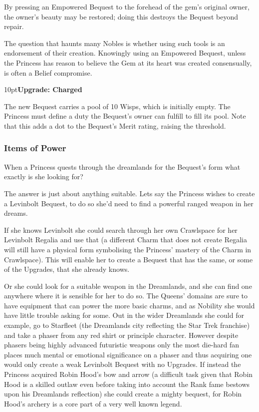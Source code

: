 By pressing an Empowered Bequest to the forehead of the gem's original owner, the owner's beauty may be restored; doing this destroys the Bequest beyond repair.

The question that haunts many Nobles is whether using such tools is an endorsement of their creation. Knowingly using an Empowered Bequest, unless the Princess has reason to believe the Gem at its heart was created consensually, is often a Belief compromise.

\begin{myindentpar}{10pt}\textbf{Upgrade: Charged}

The new Bequest carries a pool of 10 Wisps, which is initially empty. The Princess must define a duty the Bequest's owner can fulfill to fill its pool. Note that this adds a dot to the Bequest's Merit rating, raising the threshold.

\end{myindentpar} 

\bigsidebarstart



\subsubsection*{Items of Power}

When a Princess quests through the dreamlands for the Bequest's form what exactly is she looking for? 

The answer is just about anything suitable. Lets say the Princess wishes to create a Levinbolt Bequest, to do so she'd need to find a powerful ranged weapon in her dreams. 

If she knows Levinbolt she could search through her own Crawlspace for her Levinbolt Regalia and use that (a different Charm that does not create Regalia will still have a physical form symbolising the Princess' mastery of the Charm in Crawlspace). This will enable her to create a Bequest that has the same, or some of the Upgrades, that she already knows. 

Or she could look for a suitable weapon in the Dreamlands, and she can find one anywhere where it is sensible for her to do so. The Queens' domains are sure to have equipment that can power the more basic charms, and as Nobility she would have little trouble asking for some. Out in the wider Dreamlands she could for example, go to Starfleet (the Dreamlands city reflecting the Star Trek franchise) and take a phaser from any red shirt or principle character. However despite phasers being highly advanced futuristic weapons only the most die-hard fan places much mental or emotional significance on a phaser and thus acquiring one would only create a weak Levinbolt Bequest with no Upgrades. If instead the Princess acquired Robin Hood's bow and arrow (a difficult task given that Robin Hood is a skilled outlaw even before taking into account the Rank fame bestows upon his Dreamlands reflection) she could create a mighty bequest, for Robin Hood's archery is a core part of a very well known legend. 

